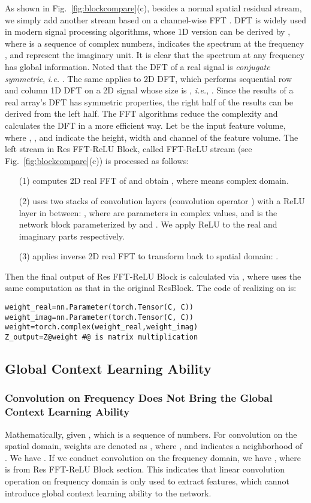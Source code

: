 \documentclass[letterpaper]{article} \usepackage{aaai23}  \usepackage{times}  \usepackage{helvet}  \usepackage{courier}  \usepackage[hyphens]{url}  \usepackage{graphicx} \usepackage{enumitem}
\begin{document}
As shown in Fig.~\ref{fig:blockcompare}(c), besides a normal spatial residual stream, we simply add another stream based on a channel-wise FFT \cite{Brigham1967the}. DFT is widely used in modern signal processing algorithms, whose 1D version can be derived by ,
where  is a sequence of  complex numbers,  indicates the spectrum at the frequency , and  represent the imaginary unit. It is clear that the spectrum at any frequency has global information. Noted that the DFT of a real signal  is \textit{conjugate symmetric}, \textit{i.e.} .
The same applies to 2D DFT, which performs sequential row and column 1D DFT on a 2D signal whose size is , \textit{i.e.}, . Since the results of a real array's DFT has symmetric properties, the right half of the results can be derived from the left half. The FFT algorithms reduce the complexity and calculates the DFT in a more efficient way. Let  be the input feature volume, where , , and  indicate the height, width and channel of the feature volume. The left stream in Res FFT-ReLU Block, called FFT-ReLU stream (see Fig.~\ref{fig:blockcompare}(c)) is processed as follows:
\begin{itemize}\item[(1)] computes 2D real FFT of  and obtain , where  means complex domain.
\item[(2)] uses two stacks of  convolution layers (convolution operator ) with a ReLU layer in between: , where  are parameters in complex values, and  is the network block parameterized by  and . We apply ReLU to the real and imaginary parts respectively.
\item[(3)] applies inverse 2D real FFT to transform  back to spatial domain: .
\end{itemize}
Then the final output of Res FFT-ReLU Block is calculated via , where  uses the same computation as that in the original ResBlock. The code of realizing  on  is:
{\small\begin{verbatim}
weight_real=nn.Parameter(torch.Tensor(C, C))
weight_imag=nn.Parameter(torch.Tensor(C, C))
weight=torch.complex(weight_real,weight_imag)
Z_output=Z@weight #@ is matrix multiplication
\end{verbatim}
}

\subsection{Global Context Learning Ability}
\subsubsection{Convolution on Frequency Does Not Bring the Global Context Learning Ability}
\label{sec:discussion-conv}
Mathematically, given , which is a sequence of  numbers. For  convolution on the spatial domain, weights are denoted as , where , and  indicates a  neighborhood of . We have . If we conduct  convolution on the frequency domain, we have , where  is from Res FFT-ReLU Block section. This indicates that linear convolution operation on frequency domain is only used to extract features, which cannot introduce global context learning ability to the network.
\end{document}
